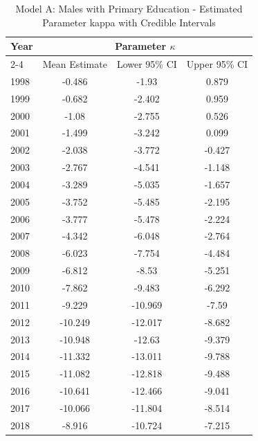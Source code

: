 \begin{landscape}
\begin{table}[htbp]
\centering
\caption{Model A: Males with Primary Education - Estimated Parameter kappa  with Credible Intervals}
\label{tab:parameters_k6}
\begin{tabular}{@{}lccc@{}}
\toprule
Year & \multicolumn{3}{c}{Parameter \(\kappa\)} \\
\cmidrule(lr){2-4}
      & Mean Estimate & Lower 95\% CI & Upper 95\% CI \\
\midrule
1998 & -0.486 & -1.93 & 0.879 \\
1999 & -0.682 & -2.402 & 0.959 \\
2000 & -1.08 & -2.755 & 0.526 \\
2001 & -1.499 & -3.242 & 0.099 \\
2002 & -2.038 & -3.772 & -0.427 \\
2003 & -2.767 & -4.541 & -1.148 \\
2004 & -3.289 & -5.035 & -1.657 \\
2005 & -3.752 & -5.485 & -2.195 \\
2006 & -3.777 & -5.478 & -2.224 \\
2007 & -4.342 & -6.048 & -2.764 \\
2008 & -6.023 & -7.754 & -4.484 \\
2009 & -6.812 & -8.53 & -5.251 \\
2010 & -7.862 & -9.483 & -6.292 \\
2011 & -9.229 & -10.969 & -7.59 \\
2012 & -10.249 & -12.017 & -8.682 \\
2013 & -10.948 & -12.63 & -9.379 \\
2014 & -11.332 & -13.011 & -9.788 \\
2015 & -11.082 & -12.818 & -9.488 \\
2016 & -10.641 & -12.466 & -9.041 \\
2017 & -10.066 & -11.804 & -8.514 \\
2018 & -8.916 & -10.724 & -7.215 \\
\bottomrule
\end{tabular}
\end{table}
\end{landscape}